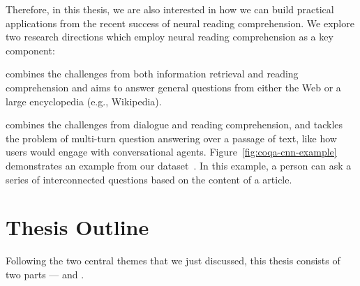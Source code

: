 Therefore, in this thesis, we are also interested in how we can build practical applications from the recent success of neural reading comprehension. We explore two research directions which employ neural reading comprehension as a key component:
\begin{description}
    \item {} combines the challenges from both information retrieval and reading comprehension and aims to answer general questions from either the Web or a large encyclopedia (e.g., Wikipedia).
    \item {} combines the challenges from dialogue and reading comprehension, and tackles the problem of multi-turn question answering over a passage of text, like how users would engage with conversational agents. Figure~\ref{fig:coqa-cnn-example} demonstrates an example from our  dataset~\cite{reddy2019coqa}. In this example, a person can ask a series of interconnected questions based on the content of a  article.
\end{description}



\section{Thesis Outline}

Following the two central themes that we just discussed, this thesis consists of two parts ---  and .

